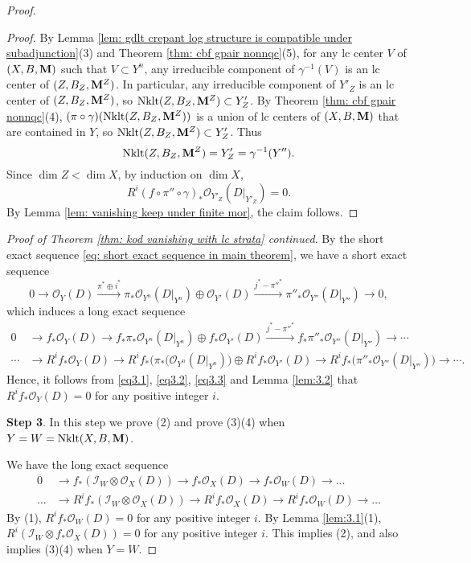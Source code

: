 \documentclass[11pt]{amsart}
\numberwithin{equation}{section}
\newcommand{\Mm}{{\bf{M}}}
\newcommand{\Nklt}{\operatorname{Nklt}}
\theoremstyle{definition}
\theoremstyle{definition}
\theoremstyle{definition}
\begin{document}
\begin{proof}
\begin{proof}
 By Lemma \ref{lem: gdlt crepant log structure is compatible under subadjunction}(3) and Theorem \ref{thm: cbf gpair nonnqc}(5), for any lc center $V$ of $(X,B,\Mm)$ such that $V\subset Y^n$, any irreducible component of $\gamma^{-1}(V)$ is an lc center of $(Z,B_Z,\Mm^Z)$. In particular, any irreducible component of $Y'_Z$ is an lc center of $(Z,B_Z,\Mm^Z)$, so $\Nklt(Z,B_Z,\Mm^Z)\subset Y'_Z$. By Theorem \ref{thm: cbf gpair nonnqc}(4), $(\pi\circ\gamma)(\Nklt(Z,B_Z,\Mm^Z))$ is a union of lc centers of $(X,B,\Mm)$ that are contained in $Y$, so $\Nklt(Z,B_Z,\Mm^Z)\subset Y'_Z$. Thus  $$\Nklt(Z,B_Z,\Mm^Z)=Y'_Z=\gamma^{-1}(Y'').$$
 Since $\dim Z<\dim X$, by induction on $\dim X$,
     $$R^i(f\circ \pi''\circ\gamma)_*\mathcal{O}_{Y'_Z}(D|_{Y'_Z})=0.$$
     By Lemma \ref{lem: vanishing keep under finite mor}, the claim follows.
\end{proof}
\noindent\textit{Proof of Theorem \ref{thm: kod vanishing with lc strata} continued}. By the short exact sequence \eqref{eq: short exact sequence in main theorem}, we have a short exact sequence
$$0\rightarrow \mathcal{O}_Y(D)\xrightarrow{\pi^*\oplus i^*}\pi_*\mathcal{O}_{Y^n}(D|_{Y^n})\oplus \mathcal{O}_{Y'}(D) \xrightarrow{j^*-\pi''^*} \pi''_*\mathcal{O}_{Y''}(D|_{Y''})\rightarrow 0,$$
which induces a long exact sequence
\begin{align*}
0&\rightarrow f_*\mathcal{O}_Y(D)\rightarrow f_*\pi_*\mathcal{O}_{Y^n}(D|_{Y^n})\oplus f_*\mathcal{O}_{Y'}(D)  \xrightarrow{j^*-\pi''^*} f_*\pi''_*\mathcal{O}_{Y''}(D|_{Y''})\rightarrow \cdots\\
\cdots &\rightarrow R^if_*\mathcal{O}_Y(D) \rightarrow R^if_*\big(\pi_*(\mathcal{O}_{Y^n}(D|_{Y^n})\big)\oplus R^if_*\mathcal{O}_{Y'}(D)\rightarrow  R^if_*\big(\pi''_*\mathcal{O}_{Y''}(D|_{Y''})\big)\rightarrow\cdots.
\end{align*}
Hence, it follows from \eqref{eq3.1}, \eqref{eq3.2}, \eqref{eq3.3} and Lemma \ref{lem:3.2} that $R^if_*\mathcal{O}_Y(D)=0$ for any positive integer $i$.

\medskip

\noindent\textbf{Step 3}. In this step we prove (2) and prove (3)(4) when $Y=W=\Nklt(X,B,\Mm)$. 

We have the long exact sequence
\begin{align*}
    0&\rightarrow f_*(\mathcal{I}_W\otimes \mathcal{O}_X(D))\rightarrow f_*\mathcal{O}_X(D)\rightarrow f_*\mathcal{O}_W(D)\rightarrow\dots\\
    \dots&\rightarrow R^if_*(\mathcal{I}_W\otimes \mathcal{O}_X(D))\rightarrow R^if_*\mathcal{O}_X(D)\rightarrow R^if_*\mathcal{O}_W(D)\rightarrow\dots
\end{align*}
By (1), $R^if_*\mathcal{O}_W(D)=0$ for any positive integer $i$. By Lemma \ref{lem:3.1}(1), $R^i(\mathcal{I}_W\otimes f_*\mathcal{O}_X(D))=0$ for any positive integer $i$. This implies (2), and also implies (3)(4) when $Y=W$.


\end{proof}
\end{document}
